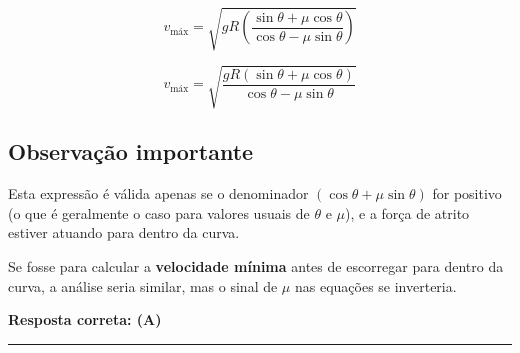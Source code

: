 \documentclass[a4paper,12pt]{article}
\begin{document}
\begin{flushleft}
\begin{equation}
v_{\text{máx}} = \sqrt{ gR \left( \frac{ \sin\theta + \mu \cos\theta }{ \cos\theta - \mu \sin\theta } \right) }
\end{equation}

\begin{equation}
\boxed{
v_{\text{máx}} = \sqrt{ \frac{gR\left( \sin\theta + \mu \cos\theta \right)}{ \cos\theta - \mu \sin\theta } }
}
\end{equation}

\subsection*{Observação importante}

Esta expressão é válida apenas se o denominador \( \left( \cos\theta + \mu \sin\theta \right) \) for positivo (o que é geralmente 
o caso para valores usuais de \(\theta\) e \(\mu\)), e a força de atrito estiver atuando para dentro da curva.

Se fosse para calcular a \textbf{velocidade mínima} antes de escorregar para dentro da curva, a análise seria similar, 
mas o sinal de \(\mu\) nas equações se inverteria.

\textbf{Resposta correta: \colorbox{green!50}{(A)}}

\end{flushleft}
\noindent\rule{\linewidth}{0.6pt}\\
\end{document}
